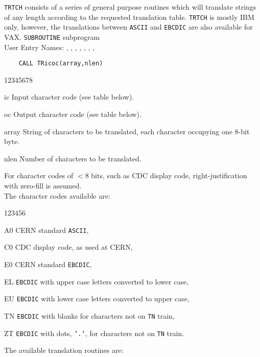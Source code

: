                   
   
            
                
{\tt TRTCH} consists of a series of general purpose routines which
will translate strings of any length according to the requested
translation table.
{\tt TRTCH} is mostly IBM only, however, the translations
between {\tt ASCII} and {\tt EBCDIC} are also available for VAX.
\Structure
{\tt SUBROUTINE} subprogram \\
User Entry Names: , , ,
, , , ,
\Usage
\begin{verbatim}
    CALL TRicoc(array,nlen)
\end{verbatim}
\begin{DLtt}{12345678}
\item [ic] Input character code (see table below).
\item [oc] Output character code (see table below).
\item [array] String of characters to be translated,
each character occupying one 8-bit byte.
\item [nlen] Number of characters to be translated.
\end{DLtt}
For character codes of $< 8$ bits, such as CDC display code,
right-justification with zero-fill is assumed. \\[3mm]
The character codes available are:
\begin{DLtt}{123456}
\item [A0] CERN standard {\tt ASCII},
\item [C0] CDC display code, as used at CERN,
\item [E0] CERN standard {\tt EBCDIC},
\item [EL] {\tt EBCDIC} with upper case letters converted to lower case,
\item [EU] {\tt EBCDIC} with lower case letters converted to upper case,
\item [TN] {\tt EBCDIC} with blanks for characters not on {\tt TN} train,
\item [ZT] {\tt EBCDIC} with dots, {\tt '.'}, for characters not on
{\tt TN} train.
\end{DLtt}
The available translation routines are:
